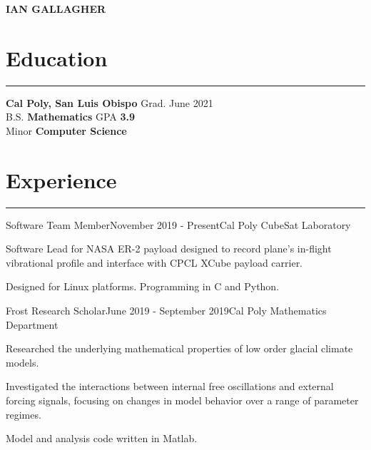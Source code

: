 \documentclass{resume_new} %
\begin{document}
\begin{paracol}{2}
%
%

\hfill{\MakeUppercase{\huge\bf Ian Gallagher}}\hfill


\section*{Education}
\hrule
{\bf Cal Poly, San Luis Obispo} \hfill Grad. June 2021 \\
B.S. \textbf{Mathematics} \hfill GPA \textbf{3.9} \\
Minor \textbf{Computer Science}

\section*{Experience}
\hrule

\begin{resumeList}{Software Team Member}{November 2019 - Present}{Cal Poly CubeSat Laboratory}{}
\item Software Lead for NASA ER-2 payload designed to record plane's in-flight vibrational profile and interface with CPCL XCube payload carrier.
\item Designed for Linux platforms. Programming in C and Python.
\end{resumeList}

\begin{resumeList}{Frost Research Scholar}{June 2019 - September 2019}{Cal Poly Mathematics Department}{}
\item Researched the underlying mathematical properties of low order glacial climate models.
\item Investigated the interactions between internal free oscillations and external forcing signals, focusing on changes in model behavior over a range of parameter regimes.
\item Model and analysis code written in Matlab.
\end{resumeList}


\end{paracol}
\end{document}
